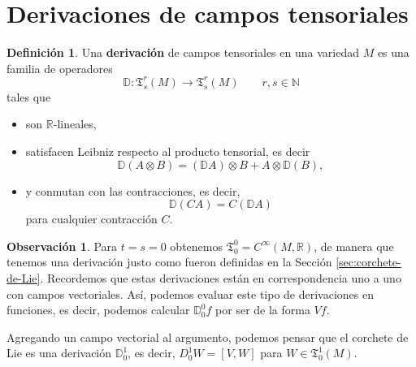 \documentclass[spanish]{book}
\theoremstyle{definition}
\newtheorem*{defn}{Definición}
\newtheorem*{obs}{Observación}
\newcommand{\R}{\mathbb{R}}
\newcommand{\N}{\mathbb{N}}
\newcommand{\D}{\mathbb{D}}
\newcommand{\T}{\mathfrak{T}}
\newcommand{\Cinf}{C^\infty}
\begin{document}
	\section{Derivaciones de campos tensoriales}
	\begin{defn}
		Una \textbf{derivación} de campos tensoriales en una variedad $M$ es una familia de operadores
		\[\D:\T_s^r(M)\to\T_s^r(M)\qquad r,s\in\N\]
		tales que
		\begin{itemize}
			\item son $\R$-lineales,
			\item satisfacen Leibniz respecto al producto tensorial, es decir
			\[\D(A\otimes B)=(\D A)\otimes B+A\otimes\D(B),\]
			\item y conmutan con las contracciones, es decir,
			\[\D(CA)=C(\D A)\]
			para cualquier contracción $C$.
		\end{itemize}
	\end{defn}
	\begin{obs}
		Para $t=s=0$ obtenemos $\T^0_0=\Cinf(M,\R)$, de manera que tenemos una derivación justo como fueron definidas en la Sección \ref{sec:corchete-de-Lie}. Recordemos que estas derivaciones están en correspondencia uno a uno con campos vectoriales. Así, podemos evaluar este tipo de derivaciones en funciones, es decir, podemos calcular $\D^0_0f$ por ser de la forma $Vf$.
		
		Agregando un campo vectorial al argumento, podemos pensar que el corchete de Lie es una derivación $\D^1_0$, es decir, $D^1_0W=[V,W]$ para $W\in\T^1_0(M)$.
	\end{obs}
	
\end{document}
